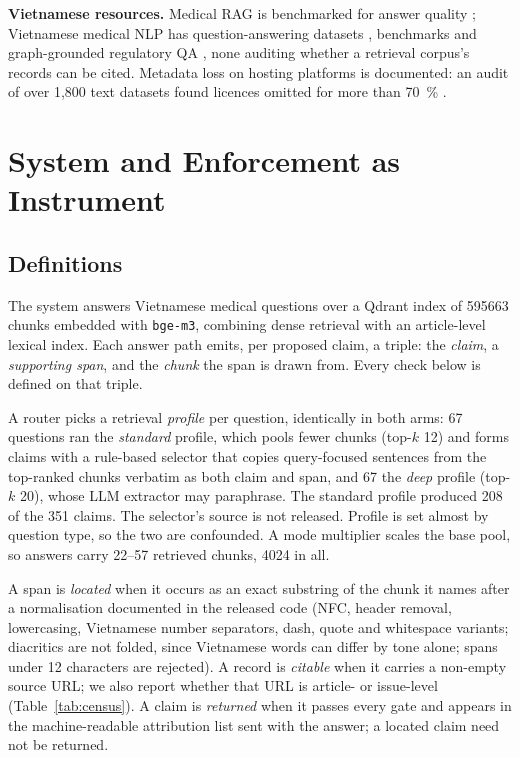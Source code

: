 \documentclass[conference,a4paper]{IEEEtran}
\begin{document}
\textbf{Vietnamese resources.} Medical RAG is benchmarked for answer quality
\cite{xiong2024mirage}; Vietnamese medical NLP has question-answering datasets
\cite{tran2024vimedaqa}, benchmarks \cite{vm14k2025} and graph-grounded regulatory QA
\cite{vihermes2026}, none auditing whether a retrieval corpus's records can be cited.
Metadata loss on hosting platforms is documented: an audit of over 1{,}800 text datasets
found licences omitted for more than \SI{70}{\percent} \cite{longpre2024provenance}.

\section{System and Enforcement as Instrument}\label{sec:system}\subsection{Definitions}
The system answers Vietnamese medical questions over a Qdrant index of \num{595663} chunks
embedded with \texttt{bge-m3}, combining dense retrieval with an article-level lexical
index. Each answer path emits, per proposed claim, a triple: the \emph{claim}, a
\emph{supporting span}, and the \emph{chunk} the span is drawn from. Every check below is
defined on that triple.

A router picks a retrieval \emph{profile} per question, identically in both arms: \num{67}
questions ran the \emph{standard} profile, which pools fewer chunks (top-$k$ \num{12}) and
forms claims with a rule-based selector that copies query-focused sentences from the
top-ranked chunks verbatim as both claim and span, and \num{67} the \emph{deep} profile
(top-$k$ \num{20}), whose LLM extractor may paraphrase. The standard profile produced
\num{208} of the \num{351} claims. The selector's source is not released. Profile is set
almost by question type, so the two are confounded. A mode multiplier scales the base pool,
so answers carry \numrange{22}{57} retrieved chunks, \num{4024} in all.

A span is \emph{located} when it occurs as an exact substring of the chunk it names after a
normalisation documented in the released code (NFC, header removal, lowercasing, Vietnamese
number separators, dash, quote and whitespace variants; diacritics are not folded, since
Vietnamese words can differ by tone alone; spans under 12 characters are rejected).
A record is \emph{citable} when it carries a non-empty source URL; we also report whether that
URL is article- or issue-level (Table~\ref{tab:census}). A claim is \emph{returned} when it
passes every gate and appears in the machine-readable attribution list sent with the answer;
a located claim need not be returned.
\end{document}
